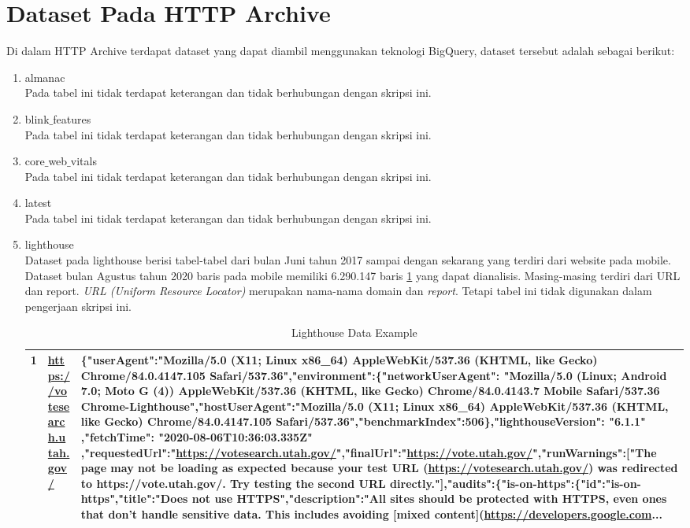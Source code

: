\section{Dataset Pada HTTP Archive}
Di dalam HTTP Archive terdapat dataset yang dapat diambil menggunakan teknologi BigQuery, dataset tersebut adalah sebagai berikut:
\begin{enumerate}
	\item almanac\\
	Pada tabel ini tidak terdapat keterangan dan tidak berhubungan dengan skripsi ini.
	\item blink$\_$features\\
	Pada tabel ini tidak terdapat keterangan dan tidak berhubungan dengan skripsi ini.
	\item core$\_$web$\_$vitals\\
	Pada tabel ini tidak terdapat keterangan dan tidak berhubungan dengan skripsi ini.
	\item latest\\
	Pada tabel ini tidak terdapat keterangan dan tidak berhubungan dengan skripsi ini.
	\item lighthouse\\
	Dataset pada lighthouse berisi tabel-tabel dari bulan Juni tahun 2017 sampai dengan sekarang yang terdiri dari website pada mobile. Dataset bulan Agustus tahun 2020 baris pada mobile memiliki 6.290.147 baris \ref{table:ct_lh_mobile} yang dapat dianalisis. Masing-masing terdiri dari URL dan report. \textit{URL (Uniform Resource Locator)} merupakan nama-nama domain dan \textit{report}. Tetapi tabel ini tidak digunakan dalam pengerjaan skripsi ini. 
	
	
	\begin{table} %
		\centering
		\begin{tabular}{|l|l|@{\extracolsep{\fill}}p{18cm}|}\hline
			1 & \url{https://votesearch.utah.gov/} & \{"userAgent":"Mozilla/5.0 (X11; Linux x86\_64) AppleWebKit/537.36 (KHTML, like Gecko) Chrome/84.0.4147.105 Safari/537.36","environment":\{"networkUserAgent": "Mozilla/5.0 (Linux; Android 7.0; Moto G (4)) AppleWebKit/537.36 (KHTML, like Gecko) Chrome/84.0.4143.7 Mobile Safari/537.36 Chrome-Lighthouse","hostUserAgent":"Mozilla/5.0 (X11; Linux x86\_64) AppleWebKit/537.36 (KHTML, like Gecko) Chrome/84.0.4147.105 Safari/537.36","benchmarkIndex":506\},"lighthouseVersion": "6.1.1" ,"fetchTime": "2020-08-06T10:36:03.335Z" ,"requestedUrl":"\url{https://votesearch.utah.gov/}","finalUrl":"\url{https://vote.utah.gov/}","runWarnings":["The page may not be loading as expected because your test URL (\url{https://votesearch.utah.gov/}) was redirected to https://vote.utah.gov/. Try testing the second URL directly."],"audits":\{"is-on-https":\{"id":"is-on-https","title":"Does not use HTTPS","description":"All sites should be protected with HTTPS, even ones that don't handle sensitive data. This includes avoiding [mixed content](\url{https://developers.google.com}...\\
			\hline
		\end{tabular}
		\caption{Lighthouse Data Example}
		\label{table:ct_lh_mobile}
	\end{table} %
	

\end{enumerate}
